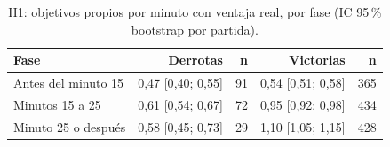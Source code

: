 \begin{table}[H]
\centering\small
\caption{H1: objetivos propios por minuto con ventaja real, por fase (IC 95\,\% bootstrap por partida).}
\label{tab:h1fases}
\begin{tabular}{lrrrr}
\toprule
Fase & Derrotas & n & Victorias & n \\
\midrule
Antes del minuto 15 & 0{,}47 [0{,}40; 0{,}55] & 91 & 0{,}54 [0{,}51; 0{,}58] & 365 \\
Minutos 15 a 25 & 0{,}61 [0{,}54; 0{,}67] & 72 & 0{,}95 [0{,}92; 0{,}98] & 434 \\
Minuto 25 o después & 0{,}58 [0{,}45; 0{,}73] & 29 & 1{,}10 [1{,}05; 1{,}15] & 428 \\
\bottomrule
\end{tabular}
\end{table}
